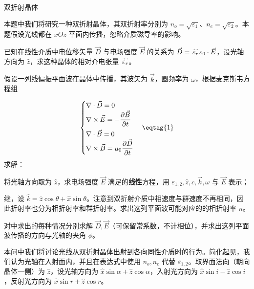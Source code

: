 \documentclass[answer]{cphos}
\begin{document}
\begin{problem}[50]{双折射晶体}

\usetikzlibrary{arrows.meta, angles, quotes}

\begin{problemstatement}

本题中我们将研究一种双折射晶体，其双折射率分别为 $n_o=\sqrt{\varepsilon_1}$、$n_e=\sqrt{\varepsilon_2}$。本题假设光线都在 $xOz$ 平面内传播，忽略介质磁导率的影响。

 已知在线性介质中电位移矢量 $\vec D$ 与电场强度 $\vec E$ 的关系为 $\vec D={}\!\stackrel{\text{\fontsize{3}{1}$\rightarrow\rightarrow$}}{\varepsilon_r}\!\varepsilon_0\cdot\vec E$，设光轴方向为 $\hat z$，求这种晶体的相对介电张量 ${}\!\stackrel{\text{\fontsize{3}{1}$\rightarrow\rightarrow$}}{\varepsilon_r}$。

 假设一列线偏振平面波在晶体中传播，其波矢为 $\vec k$，圆频率为 $\omega$，根据麦克斯韦方程组

\begin{equation}
    \begin{cases}
        \nabla\cdot\vec D=0\\
        \nabla\times\vec E=-\dfrac{\partial\vec B}{\partial t}\\[0.7em]
        \nabla\cdot\vec B=0\\
        \nabla\times\vec B=\mu_0\dfrac{\partial\vec D}{\partial t}
    \end{cases} \eqtag{1}
\end{equation}
求解：

 将光轴方向取为 $\hat z$，求电场强度 $\vec E$ 满足的\textbf{线性}方程，用 $\varepsilon_{1,2},\hat z,c,\vec k,\omega$ 与 $\vec E$ 表示；

 继，设 $\hat k=\hat z\cos\theta+\hat x\sin\theta$。注意到双折射介质中相速度与群速度不再相同，因此折射率也分为相折射率和群折射率。求出这列平面波可能对应的的相折射率 $n$。

 对中求出的每种情况分别求解 $\vec D,\vec E$（可保留常系数，不计相位），并求出这列平面波传播的方向与光轴的夹角 $\phi$。

 本问中我们将讨论光线从双折射晶体出射到各向同性介质时的行为。简化起见，我们认为光轴在入射面内，并且在表达式中使用 $n_o,n_e$ 代替 $\varepsilon_{1,2}$。取界面法向（朝向晶体一侧）为 $\hat z$，设光轴方向为 $\hat x\sin\alpha+\hat z\cos\alpha$，入射光方向为 $\hat x\sin i-\hat z\cos i$，反射光方向为 $\hat x\sin r+\hat z\cos r$。
\begin{figure}[H]
    \centering
\end{figure}
\end{problemstatement}
\end{problem}
\end{document}
